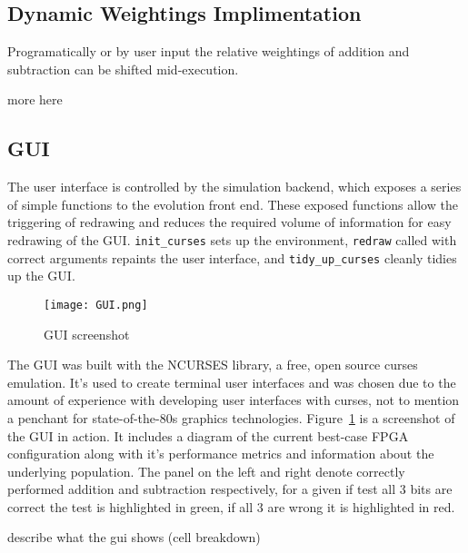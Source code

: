 \subsection{Dynamic Weightings Implimentation}
Programatically or by user input the relative weightings of addition and subtraction
can be shifted mid-execution.

\todo more here

\subsection{GUI}
The user interface is controlled by the simulation backend, which exposes a
series of simple functions to the evolution front end. These exposed functions
allow the triggering of redrawing and reduces the required volume of information
for easy redrawing of the GUI. \texttt{init\_curses} sets up the environment,
\texttt{redraw} called with correct arguments repaints the user interface, and
\texttt{tidy\_up\_curses} cleanly tidies up the GUI.

\begin{figure}
\label{fig:gui}
\texttt{[image: GUI.png]}
\caption{GUI screenshot}
\end{figure}

The GUI was built with the NCURSES library, a free, open source curses emulation.
It's used to create terminal user interfaces and was chosen due to the amount of
experience  with developing user interfaces with curses, not to
mention a penchant for state-of-the-80s graphics technologies.
Figure~\ref{fig:gui} is a screenshot of the GUI in action. It includes a diagram
of the current best-case FPGA configuration along with it's performance metrics
and information about the underlying population. The panel on the left and right
denote correctly performed addition and subtraction respectively, for a given
if test all 3 bits are correct the test is highlighted in green, if all 3 are wrong
it is highlighted in red.

\todo describe what the gui shows (cell breakdown)

